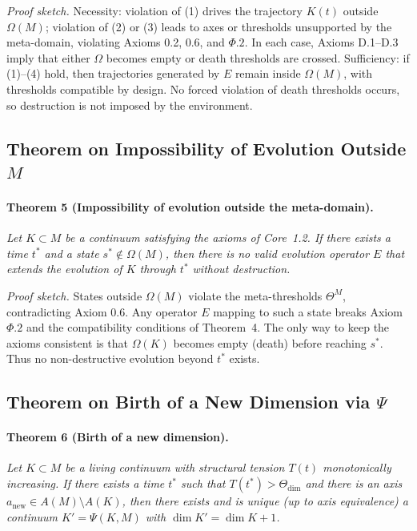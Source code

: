 \emph{Proof sketch.}
Necessity: violation of (1) drives the trajectory \(K(t)\) outside \(\Omega(M)\); violation of (2) or (3) leads to axes or thresholds unsupported by the meta-domain, violating Axioms 0.2, 0.6, and \(\Phi.2\).
In each case, Axioms D.1–D.3 imply that either \(\Omega\) becomes empty or death thresholds are crossed.
Sufficiency: if (1)–(4) hold, then trajectories generated by \(E\) remain inside \(\Omega(M)\), with thresholds compatible by design.
No forced violation of death thresholds occurs, so destruction is not imposed by the environment.

\subsection{Theorem on Impossibility of Evolution Outside \texorpdfstring{\(M\)}{M}}

\paragraph{Theorem 5 (Impossibility of evolution outside the meta-domain).}
\emph{Let \(K\subset M\) be a continuum satisfying the axioms of Core~1.2.
If there exists a time \(t^*\) and a state \(s^*\notin\Omega(M)\), then there is no valid evolution operator \(E\) that extends the evolution of \(K\) through \(t^*\) without destruction.}

\emph{Proof sketch.}
States outside \(\Omega(M)\) violate the meta-thresholds \(\Theta^M\), contradicting Axiom 0.6.
Any operator \(E\) mapping to such a state breaks Axiom \(\Phi.2\) and the compatibility conditions of Theorem~4.
The only way to keep the axioms consistent is that \(\Omega(K)\) becomes empty (death) before reaching \(s^*\).
Thus no non-destructive evolution beyond \(t^*\) exists.

\subsection{Theorem on Birth of a New Dimension via \texorpdfstring{\(\Psi\)}{\Psi}}

\paragraph{Theorem 6 (Birth of a new dimension).}
\emph{Let \(K\subset M\) be a living continuum with structural tension \(T(t)\) monotonically increasing.
If there exists a time \(t^*\) such that \(T(t^*)>\Theta_{\mathrm{dim}}\) and there is an axis \(a_{\mathrm{new}}\in A(M)\setminus A(K)\), then there exists and is unique (up to axis equivalence) a continuum \(K'=\Psi(K,M)\) with \(\dim K'=\dim K+1\).}

